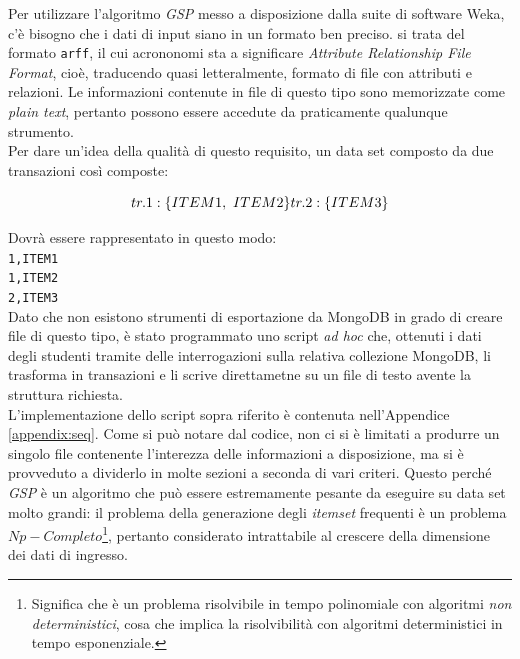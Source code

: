 	Per utilizzare l'algoritmo \textit{GSP} messo a disposizione dalla suite di software Weka, c'è bisogno che i dati di input siano in un formato ben preciso. si trata del formato \texttt{arff}, il cui acrononomi sta a significare \textit{Attribute Relationship File Format}, cioè, traducendo quasi letteralmente, formato di file con attributi e relazioni. Le informazioni contenute in file di questo tipo sono memorizzate come \textit{plain text}, pertanto possono essere accedute da praticamente qualunque strumento.\\

	Per dare un'idea della qualità di questo requisito, un data set composto da due transazioni così composte: 
	
	\[tr. 1: \{ITEM1,\ ITEM2\} \\
	tr. 2: \{ITEM3\}\]

	\vspace{0.2cm}

	Dovrà essere rappresentato in questo modo: \\

	\noindent\texttt{1,ITEM1}\\
	\texttt{1,ITEM2}\\
	\texttt{2,ITEM3}\\

	Dato che non esistono strumenti di esportazione da MongoDB in grado di creare file di questo tipo, è stato programmato uno script \textit{ad hoc} che, ottenuti i dati degli studenti tramite delle interrogazioni sulla relativa collezione MongoDB, li trasforma in transazioni e li scrive direttametne su un file di testo avente la struttura richiesta. \\

	L'implementazione dello script sopra riferito è contenuta nell'Appendice \ref{appendix:seq}. Come si può notare dal codice, non ci si è limitati a produrre un singolo file contenente l'interezza delle informazioni a disposizione, ma si è provveduto a dividerlo in molte sezioni a seconda di vari criteri. Questo perché \textit{GSP} è un algoritmo che può essere estremamente pesante da eseguire su data set molto grandi: il problema della generazione degli \textit{itemset} frequenti è un problema $Np-Completo$\footnote{Significa che è un problema risolvibile in tempo polinomiale con algoritmi \textit{non deterministici}, cosa che implica la risolvibilità con algoritmi deterministici in tempo esponenziale.}, pertanto considerato intrattabile al crescere della dimensione dei dati di ingresso.\\

